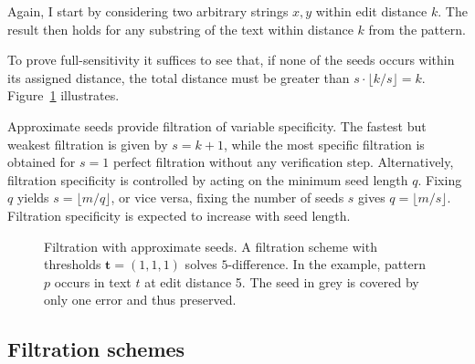 Again, I start by considering two arbitrary strings $x,y$ within edit distance $k$.
The result then holds for any substring of the text within distance $k$ from the pattern.
To prove full-sensitivity it suffices to see that, if none of the seeds occurs within its assigned distance, the total distance must be greater than $s \cdot \lfloor k/s \rfloor = k$.
Figure~\ref{fig:seeds-apx} illustrates.

Approximate seeds provide filtration of variable specificity.
The fastest but weakest filtration is given by $s=k+1$, while the most specific filtration is obtained for $s=1$ \ie perfect filtration without any verification step.
Alternatively, filtration specificity is controlled by acting on the minimum seed length $q$.
Fixing $q$ yields $s = \lfloor m/q \rfloor$, or vice versa, fixing the number of seeds $s$ gives $q =\lfloor m/s \rfloor$.
Filtration specificity is expected to increase with seed length.

\begin{figure}[h]
\begin{center}
\caption[Filtration with approximate seeds]{Filtration with approximate seeds. A filtration scheme with thresholds $\mathbf{t} = (1,1,1)$ solves $5$-difference. In the example, pattern $p$ occurs in text $t$ at edit distance 5. The seed in grey is covered by only one error and thus preserved.}
\label{fig:seeds-apx}

\end{center}
\end{figure}


\subsection{Filtration schemes}


